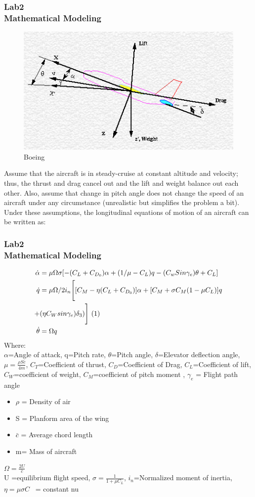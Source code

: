\documentclass[hyperref={pdfpagelabels=true}]{beamer}
\newcounter{angle}
\begin{document}
\begin{frame}[shrink]
\frametitle{Lab2 \\{\large Mathematical Modeling}}
\begin{figure}[!tbp]
\includegraphics[scale = 0.35]{figs/Selection_041.png}
    \caption{Boeing}
\end{figure}
\small{
Assume that the aircraft is in steady-cruise at constant altitude and velocity; thus, the thrust and drag cancel out and the lift and weight balance out each other. Also, assume that change in pitch angle does not change the speed of an aircraft under any circumstance (unrealistic but simplifies the problem a bit). Under these assumptions, the longitudinal equations of motion of an aircraft can be written as:}
\end{frame}

\begin{frame}
\frametitle{Lab2 \\{\large Mathematical Modeling}}
\scriptsize{
\begin{align*}
\dot{\alpha}&=\mu\Omega\sigma[-(C_L+C_{D_0})\alpha+(1/ \mu -C_L)q-(C_wSin\gamma_e)\theta+C_L] \\ 
\dot{q}&=\mu\Omega/2i_n \Bigg[ [C_M-\eta(C_L+C_{D_0})]\alpha 
 + [C_M+\sigma C_M(1-\mu C_L)]q \\ +& (\eta C_Wsin\gamma_e)\delta_3) \Bigg] \ \text(1) \\
\dot{\theta}&=\Omega q
\end{align*}
Where: \\
 $\alpha$=Angle of attack,  
q=Pitch rate, 
$\theta$=Pitch angle, 
$\delta $=Elevator deflection angle,  
$\mu=\frac{\rho S\bar{c}}{4m}$,
$C_T$=Coefficient of thrust, $C_D$=Coefficient of Drag, $C_L$=Coefficient of lift, $C_W$=coefficient of weight, $C_M$=coefficient of pitch moment , $\gamma_e$ = Flight path angle
\begin{itemize}
\item[] $\rho$ = Density of air
\item[] S = Planform area of the wing 
\item[] $\bar{c}$ = Average chord length
\item[] m= Mass of aircraft
\end{itemize}
$\Omega=\frac{2U}{\bar{c}}$ \\
U =equilibrium flight speed, 
$\sigma =\frac{1}{1+\mu C_L}$, $i_n$=Normalized moment of inertia, $\eta=\mu \sigma C$ \ = constant nu
}
\end{frame}
\end{document}
